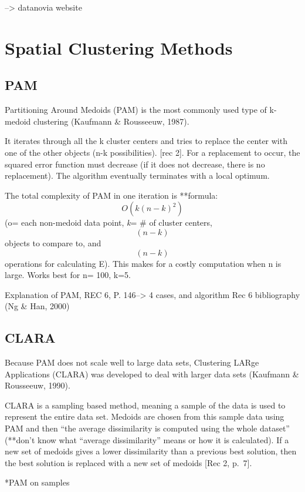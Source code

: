 \documentclass[12pt,twoside]{amherstthesis}
\begin{document}
  --\textgreater{} datanovia website
  
  \chapter{Spatial Clustering Methods}\label{typeset-equ}
  
  \section{PAM}\label{pam}
  
  Partitioning Around Medoids (PAM) is the most commonly used type of
  k-medoid clustering (Kaufmann \& Rousseeuw, 1987).
  
  It iterates through all the k cluster centers and tries to replace the
  center with one of the other objects (n-k possibilities). {[}rec 2{]}.
  For a replacement to occur, the squared error function must decrease (if
  it does not decrease, there is no replacement). The algorithm eventually
  terminates with a local optimum.
  
  The total complexity of PAM in one iteration is **formula:
  \[O(k(n-k)^2)\] (o= each non-medoid data point, \emph{k}= \# of cluster
  centers, \[(n-k)\] objects to compare to, and \[(n-k)\] operations for
  calculating E). This makes for a costly computation when n is large.
  Works best for n= 100, k=5.
  
  Explanation of PAM, REC 6, P. 146--\textgreater{} 4 cases, and algorithm
  Rec 6 bibliography (Ng \& Han, 2000)
  
  \section{CLARA}\label{clara}
  
  Because PAM does not scale well to large data sets, Clustering LARge
  Applications (CLARA) was developed to deal with larger data sets
  (Kaufmann \& Rousseeuw, 1990).
  
  CLARA is a sampling based method, meaning a sample of the data is used
  to represent the entire data set. Medoids are chosen from this sample
  data using PAM and then ``the average dissimilarity is computed using
  the whole dataset'' (**don't know what ``average dissimilarity'' means
  or how it is calculated). If a new set of medoids gives a lower
  dissimilarity than a previous best solution, then the best solution is
  replaced with a new set of medoids {[}Rec 2, p.~7{]}.
  
  *PAM on samples
  
\end{document}

